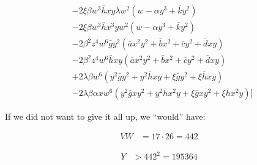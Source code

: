 \begin{align}
&-2 \xi\beta w^3 \bar h x y\lambda w^2 (  w - \alpha y^3  + \bar k y^2 ) \\
&-2 \xi\beta w^3 \bar h x^3 y w^2 (  w - \alpha y^3  + \bar k y^2 ) \\
&-2 \beta^2 z^4w^6\bar g y^2 (\bar a x^2 y^2 + \bar b x^2 + \bar c y^2 + \bar d xy ) \\
&-2 \beta^2 z^4w^6\bar h x y (\bar a x^2 y^2 + \bar b x^2 + \bar c y^2 + \bar d xy ) \\
&+ 2 \lambda \beta w^6 (y^2 \bar g y^2 + y^2 \bar h x y + \xi \bar g y^2 + \xi \bar h x y) \\
&- 2 \lambda \beta \alpha x w^6 (y^2 \bar g xy^2 + y^2 \bar h x^2 y + \xi \bar g xy^2 + \xi \bar h x^2 y)\biggr]
\end{align}

If we did not want to give it all up, we ``would'' have:

\begin{align}
VW &= 17\cdot 26 = 442
\end{align}

\begin{align}
Y &> 442^2 = 195364
\end{align}


